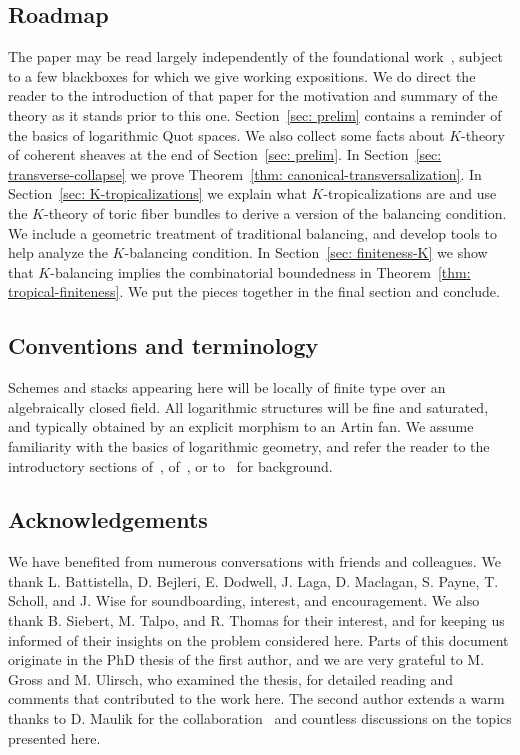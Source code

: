\documentclass[11pt]{amsart}
\theoremstyle{definition}
\theoremstyle{definition}
\begin{document}
\subsection{Roadmap} The paper may be read largely independently of the foundational work~\cite{Logquot}, subject to a few blackboxes for which we give working expositions. We do direct the reader to the introduction of that paper for the motivation and summary of the theory as it stands prior to this one. Section~\ref{sec: prelim} contains a reminder of the basics of logarithmic Quot spaces. We also collect some facts about $K$-theory of coherent sheaves at the end of Section~\ref{sec: prelim}. In Section~\ref{sec: transverse-collapse} we prove Theorem~\ref{thm: canonical-transversalization}. In Section~\ref{sec: K-tropicalizations} we explain what $K$-tropicalizations are and use the $K$-theory of toric fiber bundles to derive a version of the balancing condition. We include a geometric treatment of traditional balancing, and develop tools to help analyze the $K$-balancing condition. In Section~\ref{sec: finiteness-K} we show that $K$-balancing implies the combinatorial boundedness in Theorem~\ref{thm: tropical-finiteness}. We put the pieces together in the final section and conclude. 

\subsection{Conventions and terminology} Schemes and stacks appearing here will be locally of finite type over an algebraically closed field. All logarithmic structures will be fine and saturated, and typically obtained by an explicit morphism to an Artin fan. We assume familiarity with the basics of logarithmic geometry, and refer the reader to the introductory sections of~\cite{MR20,MR23}, of~\cite{ModStckTropCurve}, or to~\cite{ACMUW} for background. 

\subsection{Acknowledgements} We have benefited from numerous conversations with friends and colleagues. We thank L. Battistella, D. Bejleri, E. Dodwell, J. Laga, D. Maclagan, S. Payne, T. Scholl, and J. Wise for soundboarding, interest, and encouragement. We also thank B. Siebert, M. Talpo, and R. Thomas for their interest, and for keeping us informed of their insights on the problem considered here. Parts of this document originate in the PhD thesis of the first author, and we are very grateful to M. Gross and M. Ulirsch, who examined the thesis, for detailed reading and comments that contributed to the work here. The second author extends a warm thanks to D. Maulik for the collaboration~\cite{MR20} and countless discussions on the topics presented here. 
\end{document}
